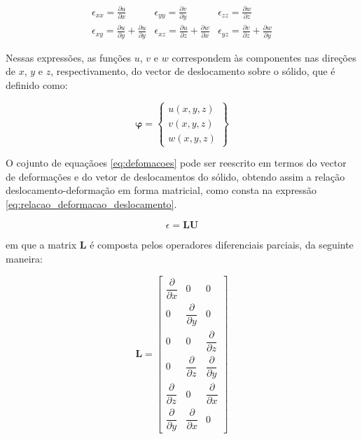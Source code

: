 \begin{equation} \label{eq:defomacoes}
    \begin{matrix}
        \epsilon_{xx} = \frac{\partial u}{\partial x} &
        \epsilon_{yy} = \frac{\partial v}{\partial y} &
        \epsilon_{zz} = \frac{\partial w}{\partial z} \\
        \epsilon_{xy} = \frac{\partial u}{\partial y} + \frac{\partial u}{\partial y} &
        \epsilon_{xz} = \frac{\partial u}{\partial z} + \frac{\partial w}{\partial x} &
        \epsilon_{yz} = \frac{\partial v}{\partial z} + \frac{\partial w}{\partial y}
    \end{matrix}
\end{equation}

Nessas expressões, as funções $u$, $v$ e $w$ correspondem às componentes nas direções de $x$, $y$ e $z$, respectivamento, do vector de deslocamento sobre o sólido, que é definido como:

\begin{equation} \label{eq:funcao_deslocamento}
    \mathbf{\varphi} = \begin{Bmatrix}
        u(x,y,z) \\
        v(x,y,z) \\
        w(x,y,z)
    \end{Bmatrix}
\end{equation}


O cojunto de equaçãoes \ref{eq:defomacoes} pode ser reescrito em termos do vector de deformações e do vetor de deslocamentos do sólido, obtendo assim a relação deslocamento-deformação em forma matricial, como consta na expressão \ref{eq:relacao_deformacao_deslocamento}.

\begin{equation} \label{eq:relacao_deformacao_deslocamento}
    \epsilon = \mathbf{L} \mathbf{U}
\end{equation}

em que a matrix $\mathbf{L}$ é composta pelos operadores diferenciais parciais, da seguinte maneira:

\begin{equation}
    \mathbf{L} = \begin{bmatrix}
        \dfrac{\partial}{\partial x} & 0 & 0 \\
        0 & \dfrac{\partial}{\partial y} & 0 \\
        0 & 0 & \dfrac{\partial}{\partial z} \\
        0 & \dfrac{\partial}{\partial z} & \dfrac{\partial}{\partial y} \\
        \dfrac{\partial}{\partial z} & 0 & \dfrac{\partial}{\partial x} \\
        \dfrac{\partial}{\partial y} & \dfrac{\partial}{\partial x} & 0
    \end{bmatrix}
\end{equation}

